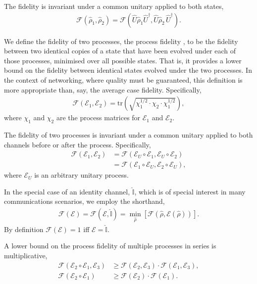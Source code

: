 The fidelity is invariant under a common unitary applied to both states,
\begin{align}
\mathcal{F}(\hat\rho_1,\hat\rho_2) = \mathcal{F}(\hat{U}\hat\rho_1 \hat{U}^\dag,\hat{U} \hat\rho_2\,\hat{U}^\dag).
\end{align}

We define the fidelity of two processes, the process fidelity  \cite{bib:Gilchrist05}, to be the fidelity between two identical copies of a state that have been evolved under each of those processes, minimised over all possible states. That is, it provides a lower bound on the fidelity between identical states evolved under the two processes. In the context of networking, where quality must be guaranteed, this definition is more appropriate than, say, the average case fidelity. Specifically,
\begin{align}
\mathcal{F}(\mathcal{E}_1,\mathcal{E}_2) = \mathrm{tr}\left( \sqrt{\chi_1^{1/2}\cdot\chi_2\cdot\chi_1^{1/2}}\right),
\end{align}
where $\chi_1$ and $\chi_2$ are the process matrices for $\mathcal{E}_1$ and $\mathcal{E}_2$.

The fidelity of two processes is invariant under a common unitary applied to both channels before or after the process. Specifically,
\begin{align}
\mathcal{F}(\mathcal{E}_1,\mathcal{E}_2) &= \mathcal{F}(\mathcal{E}_U\circ\mathcal{E}_1,\mathcal{E}_U\circ\mathcal{E}_2) \nonumber \\
&= \mathcal{F}(\mathcal{E}_1\circ \mathcal{E}_U,\mathcal{E}_2\circ \mathcal{E}_U),
\end{align}
where $\mathcal{E}_U$ is an arbitrary unitary process.

In the special case of an identity channel, $\hat{\mathbb{I}}$, which is of special interest in many communications scenarios, we employ the shorthand,
\begin{align}
\mathcal{F}(\mathcal{E}) = \mathcal{F}(\mathcal{E},\hat{\mathbb{I}}) = \min_{\hat\rho} \left[\mathcal{F}(\hat\rho,\mathcal{E}(\hat\rho))\right].
\end{align}
By definition \mbox{$\mathcal{F}(\mathcal{E})=1$} iff \mbox{$\mathcal{E}=\hat{\mathbb{I}}$}.

A lower bound on the process fidelity of multiple processes in series is multiplicative,
\begin{align}
\mathcal{F}(\mathcal{E}_2\circ\mathcal{E}_1,\mathcal{E}_3) &\geq \mathcal{F}(\mathcal{E}_2,\mathcal{E}_3)\cdot\mathcal{F}(\mathcal{E}_1,\mathcal{E}_3), \nonumber \\
\mathcal{F}(\mathcal{E}_2\circ\mathcal{E}_1) &\geq \mathcal{F}(\mathcal{E}_2)\cdot\mathcal{F}(\mathcal{E}_1).
\end{align}

